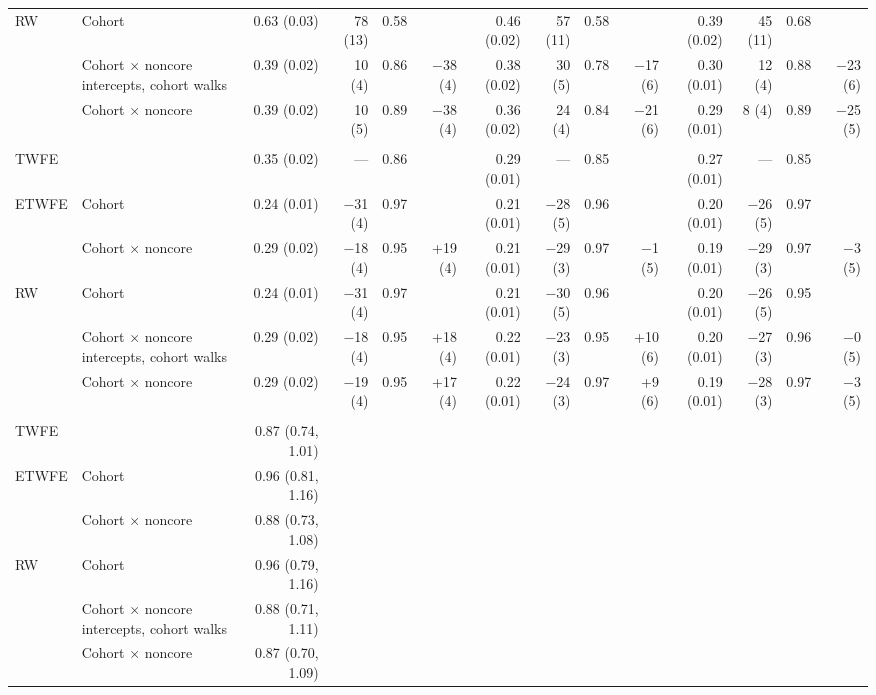 \begin{table}[t]
\begin{tabular*}{1\linewidth}{@{\extracolsep{\fill}}llrrrrrrrrrrrr}
RW & Cohort & 0.63 (0.03) & 78 (13) & 0.58 &  & 0.46 (0.02) & 57 (11) & 0.58 &  & 0.39 (0.02) & 45 (11) & 0.68 &  \\ 
 & Cohort × noncore intercepts, cohort walks & 0.39 (0.02) & 10 (4) & 0.86 & −38 (4) & 0.38 (0.02) & 30 (5) & 0.78 & −17 (6) & 0.30 (0.01) & 12 (4) & 0.88 & −23 (6) \\ 
 & Cohort × noncore & 0.39 (0.02) & 10 (5) & 0.89 & −38 (4) & 0.36 (0.02) & 24 (4) & 0.84 & −21 (6) & 0.29 (0.01) & 8 (4) & 0.89 & −25 (5) \\ 
\midrule\addlinespace[2.5pt]
\multicolumn{14}{l}{With covariates} \\[2.5pt] 
\midrule\addlinespace[2.5pt]
TWFE &  & 0.35 (0.02) & — & 0.86 &  & 0.29 (0.01) & — & 0.85 &  & 0.27 (0.01) & — & 0.85 &  \\ 
ETWFE & Cohort & 0.24 (0.01) & −31 (4) & 0.97 &  & 0.21 (0.01) & −28 (5) & 0.96 &  & 0.20 (0.01) & −26 (5) & 0.97 &  \\ 
 & Cohort × noncore & 0.29 (0.02) & −18 (4) & 0.95 & +19 (4) & 0.21 (0.01) & −29 (3) & 0.97 & −1 (5) & 0.19 (0.01) & −29 (3) & 0.97 & −3 (5) \\ 
RW & Cohort & 0.24 (0.01) & −31 (4) & 0.97 &  & 0.21 (0.01) & −30 (5) & 0.96 &  & 0.20 (0.01) & −26 (5) & 0.95 &  \\ 
 & Cohort × noncore intercepts, cohort walks & 0.29 (0.02) & −18 (4) & 0.95 & +18 (4) & 0.22 (0.01) & −23 (3) & 0.95 & +10 (6) & 0.20 (0.01) & −27 (3) & 0.96 & −0 (5) \\ 
 & Cohort × noncore & 0.29 (0.02) & −19 (4) & 0.95 & +17 (4) & 0.22 (0.01) & −24 (3) & 0.97 & +9 (6) & 0.19 (0.01) & −28 (3) & 0.97 & −3 (5) \\ 
\midrule\addlinespace[2.5pt]
\multicolumn{14}{l}{Case study (with covariates)} \\[2.5pt] 
\midrule\addlinespace[2.5pt]
TWFE &  & 0.87 (0.74, 1.01) &  &  &  &  &  &  &  &  &  &  &  \\ 
ETWFE & Cohort & 0.96 (0.81, 1.16) &  &  &  &  &  &  &  &  &  &  &  \\ 
 & Cohort × noncore & 0.88 (0.73, 1.08) &  &  &  &  &  &  &  &  &  &  &  \\ 
RW & Cohort & 0.96 (0.79, 1.16) &  &  &  &  &  &  &  &  &  &  &  \\ 
 & Cohort × noncore intercepts, cohort walks & 0.88 (0.71, 1.11) &  &  &  &  &  &  &  &  &  &  &  \\ 
 & Cohort × noncore & 0.87 (0.70, 1.09) &  &  &  &  &  &  &  &  &  &  &  \\ 
\bottomrule
\end{tabular*}
\end{table}

